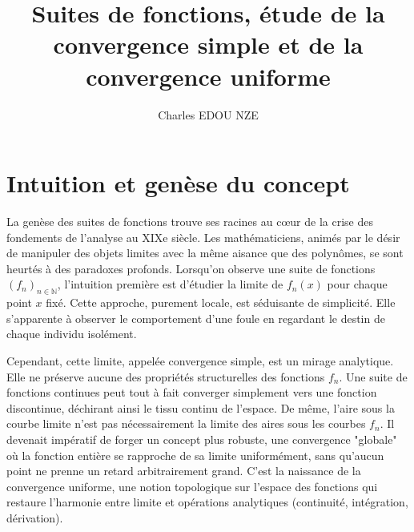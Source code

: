 \documentclass[11pt,a4paper]{article}
\title{Suites de fonctions, étude de la convergence simple et de la convergence uniforme}
\author{Charles EDOU NZE}
\date{}
\begin{document}
\maketitle

\tableofcontents
\newpage

\section{Intuition et genèse du concept}

La genèse des suites de fonctions trouve ses racines au cœur de la crise des fondements de l'analyse au XIXe siècle. Les mathématiciens, animés par le désir de manipuler des objets limites avec la même aisance que des polynômes, se sont heurtés à des paradoxes profonds. Lorsqu'on observe une suite de fonctions $(f_n)_{n \in \mathbb{N}}$, l'intuition première est d'étudier la limite de $f_n(x)$ pour chaque point $x$ fixé. Cette approche, purement locale, est séduisante de simplicité. Elle s'apparente à observer le comportement d'une foule en regardant le destin de chaque individu isolément.

Cependant, cette limite, appelée convergence simple, est un mirage analytique. Elle ne préserve aucune des propriétés structurelles des fonctions $f_n$. Une suite de fonctions continues peut tout à fait converger simplement vers une fonction discontinue, déchirant ainsi le tissu continu de l'espace. De même, l'aire sous la courbe limite n'est pas nécessairement la limite des aires sous les courbes $f_n$. Il devenait impératif de forger un concept plus robuste, une convergence "globale" où la fonction entière se rapproche de sa limite uniformément, sans qu'aucun point ne prenne un retard arbitrairement grand. C'est la naissance de la convergence uniforme, une notion topologique sur l'espace des fonctions qui restaure l'harmonie entre limite et opérations analytiques (continuité, intégration, dérivation).

\begin{center}
\end{center}
\end{document}
